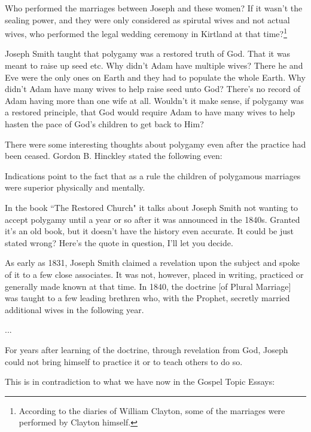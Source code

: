 Who performed the marriages between Joseph and these women? If it wasn't the sealing
power, and they were only considered as spirutal wives and not actual wives, who
performed the legal wedding ceremony in Kirtland at that time?\footnote{According
to the diaries of William Clayton, some of the marriages were performed by Clayton 
himself.}

Joseph Smith taught that polygamy was a restored truth of God. That it was meant to
raise up seed etc. Why didn't Adam have multiple wives? There he and Eve were the
only ones on Earth and they had to populate the whole Earth. Why didn't Adam have
many wives to help raise seed unto God? There's no record of Adam having more than
one wife at all. Wouldn't it make sense, if polygamy was a restored principle, that
God would require Adam to have many wives to help hasten the pace of God's children
to get back to Him?

There were some interesting thoughts about polygamy even after the practice had been
ceased. Gordon B. Hinckley stated the following even:

\begin{displayquote}
Indications point to the fact that as a rule the children of polygamous marriages
were superior physically and mentally.\cite{hinckley}
\end{displayquote}

In the book ``The Restored Church" it talks about Joseph Smith not wanting to accept
polygamy until a year or so after it was announced in the 1840s. Granted it's an old
book, but it doesn't have the history even accurate. It could be just stated wrong?
Here's the quote in question, I'll let you decide.

\begin{displayquote}
As early as 1831, Joseph Smith claimed a revelation upon the subject and spoke of it
to a few close associates. It was not, however, placed in writing, practiced or
generally made known at that time. In 1840, the doctrine [of Plural Marriage] was 
taught to a few leading brethren who, with the Prophet, secretly  married additional 
wives in the following year.

...

For years after learning of the doctrine, through revelation from God, Joseph could
not bring himself to practice it or to teach others to do so.\cite{restored}
\end{displayquote}

This is in contradiction to what we have now in the Gospel Topic Essays:

